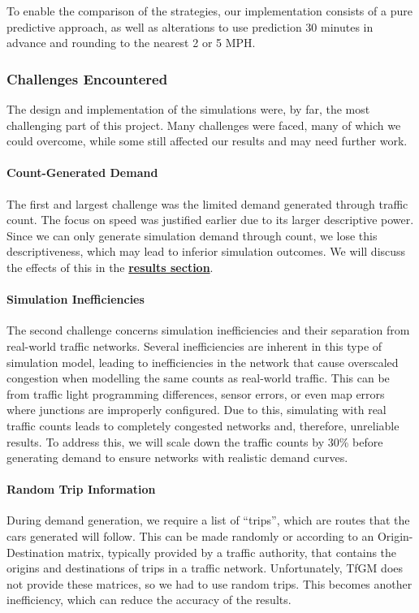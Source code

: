 To enable the comparison of the strategies, our implementation consists of a pure predictive approach, as well as alterations to use prediction 30 minutes in advance and rounding to the nearest 2 or 5 MPH.

\subsubsection{Challenges Encountered}
The design and implementation of the simulations were, by far, the most challenging part of this project. Many challenges were faced, many of which we could overcome, while some still affected our results and may need further work.

\paragraph{Count-Generated Demand}
\label{link:count-demand}
The first and largest challenge was the limited demand generated through traffic count. The focus on speed was justified earlier due to its larger descriptive power. Since we can only generate simulation demand through count, we lose this descriptiveness, which may lead to inferior simulation outcomes. We will discuss the effects of this in the \textbf{\hyperref[link:demand-results]{results section}}.

\paragraph{Simulation Inefficiencies}
\label{link:sim-inef}
The second challenge concerns simulation inefficiencies and their separation from real-world traffic networks. Several inefficiencies are inherent in this type of simulation model, leading to inefficiencies in the network that cause overscaled congestion when modelling the same counts as real-world traffic. This can be from traffic light programming differences, sensor errors, or even map errors where junctions are improperly configured. Due to this, simulating with real traffic counts leads to completely congested networks and, therefore, unreliable results. To address this, we will scale down the traffic counts by 30\% before generating demand to ensure networks with realistic demand curves.

\paragraph{Random Trip Information}
\label{link:trip-info}
During demand generation, we require a list of “trips”, which are routes that the cars generated will follow. This can be made randomly or according to an Origin-Destination matrix, typically provided by a traffic authority, that contains the origins and destinations of trips in a traffic network. Unfortunately, TfGM does not provide these matrices, so we had to use random trips. This becomes another inefficiency, which can reduce the accuracy of the results.

